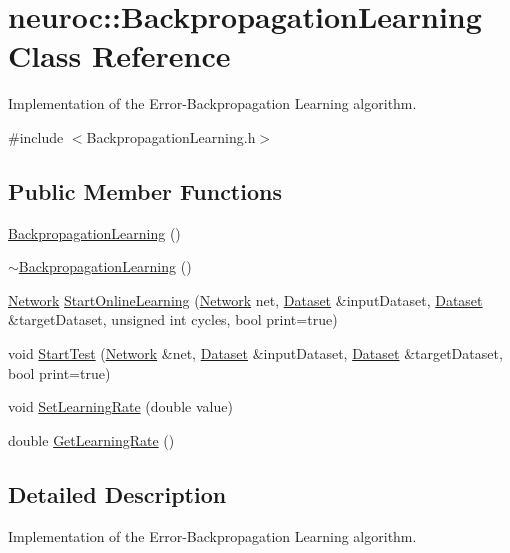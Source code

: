 \hypertarget{classneuroc_1_1_backpropagation_learning}{\section{neuroc\-:\-:Backpropagation\-Learning Class Reference}
\label{classneuroc_1_1_backpropagation_learning}
}


Implementation of the Error-\/\-Backpropagation Learning algorithm.  




{\ttfamily \#include $<$Backpropagation\-Learning.\-h$>$}

\subsection*{Public Member Functions}
\begin{DoxyCompactItemize}
\item 
\hyperlink{classneuroc_1_1_backpropagation_learning_abcce7c127fec944f38b161f120a5baf0}{Backpropagation\-Learning} ()
\item 
\hyperlink{classneuroc_1_1_backpropagation_learning_a4b95862aa9464c4bdc1e3d6717c87896}{$\sim$\-Backpropagation\-Learning} ()
\item 
\hyperlink{classneuroc_1_1_network}{Network} \hyperlink{classneuroc_1_1_backpropagation_learning_a70f879c3b73087bb91a18debc4f0c510}{Start\-Online\-Learning} (\hyperlink{classneuroc_1_1_network}{Network} net, \hyperlink{classneuroc_1_1_dataset}{Dataset} \&input\-Dataset, \hyperlink{classneuroc_1_1_dataset}{Dataset} \&target\-Dataset, unsigned int cycles, bool print=true)
\item 
void \hyperlink{classneuroc_1_1_backpropagation_learning_a07c4400e12f967ec7af88035a3b5d6ea}{Start\-Test} (\hyperlink{classneuroc_1_1_network}{Network} \&net, \hyperlink{classneuroc_1_1_dataset}{Dataset} \&input\-Dataset, \hyperlink{classneuroc_1_1_dataset}{Dataset} \&target\-Dataset, bool print=true)
\item 
void \hyperlink{classneuroc_1_1_backpropagation_learning_a09a5f7fe5d6e983f80828f2eb146ca57}{Set\-Learning\-Rate} (double value)
\item 
double \hyperlink{classneuroc_1_1_backpropagation_learning_ad826c78e592949805883117789cb0133}{Get\-Learning\-Rate} ()
\end{DoxyCompactItemize}


\subsection{Detailed Description}
Implementation of the Error-\/\-Backpropagation Learning algorithm. 

